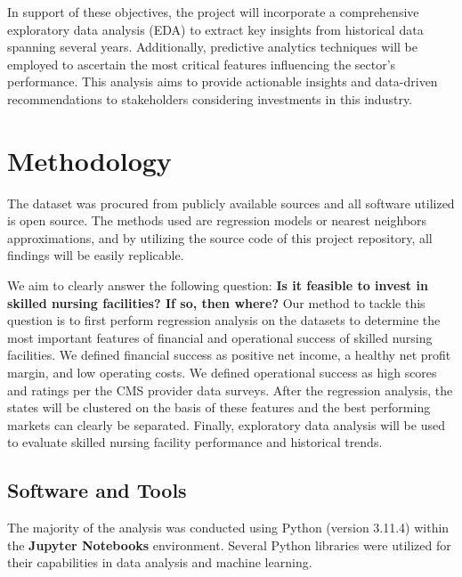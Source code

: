 \documentclass{article}
\theoremstyle{mytheoremstyle}
\theoremstyle{mytheoremstyle}
\theoremstyle{myproblemstyle}
\begin{document}
In support of these objectives, the project will incorporate a comprehensive exploratory data analysis (EDA) to extract key insights from historical data spanning several years. Additionally, predictive analytics techniques will be employed to ascertain the most critical features influencing the sector’s performance. This analysis aims to provide actionable insights and data-driven recommendations to stakeholders considering investments in this industry.

\pagebreak
\section{Methodology}

The dataset was procured from publicly available sources and all software utilized is open source. The methods used are regression models or nearest neighbors approximations, and by utilizing the source code of this project repository, all findings will be easily replicable.

We aim to clearly answer the following question: \textbf{Is it feasible to invest in skilled nursing facilities? If so, then where?} Our method to tackle this question is to first perform regression analysis on the datasets to determine the most important features of financial and operational success of skilled nursing facilities. We defined financial success as positive net income, a healthy net profit margin, and low operating costs. We defined operational success as high scores and ratings per the CMS provider data surveys. After the regression analysis, the states will be clustered on the basis of these features and the best performing markets can clearly be separated. Finally, exploratory data analysis will be used to evaluate skilled nursing facility performance and historical trends. 


\subsection{Software and Tools}

The majority of the analysis was conducted using Python (version 3.11.4) within the \textbf{Jupyter Notebooks} environment. Several Python libraries were utilized for their capabilities in data analysis and machine learning. 
\end{document}
